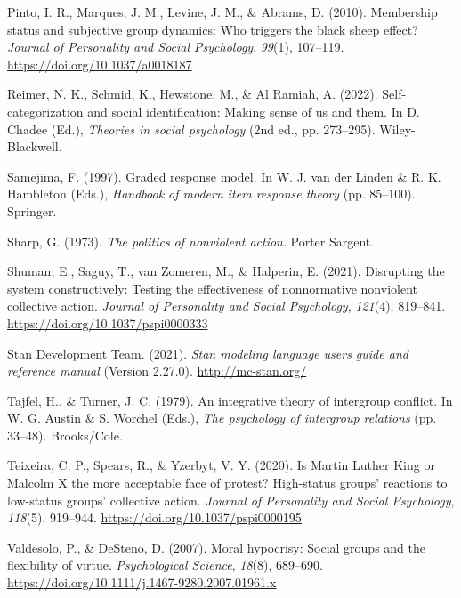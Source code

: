 \documentclass[twocolumn, 11pt, letterpaper]{article}
\newenvironment{CSLReferences}[2]{}{}
\begin{document}
\begin{CSLReferences}{1}{0}
\leavevmode{}%
Pinto, I. R., Marques, J. M., Levine, J. M., \& Abrams, D. (2010).
Membership status and subjective group dynamics: Who triggers the black
sheep effect? \emph{Journal of Personality and Social Psychology},
\emph{99}(1), 107--119. \url{https://doi.org/10.1037/a0018187}

\leavevmode{}%
Reimer, N. K., Schmid, K., Hewstone, M., \& Al Ramiah, A. (2022).
Self-categorization and social identification: Making sense of us and
them. In D. Chadee (Ed.), \emph{Theories in social psychology} (2nd ed.,
pp. 273--295). Wiley-Blackwell.

\leavevmode{}%
Samejima, F. (1997). Graded response model. In W. J. van der Linden \&
R. K. Hambleton (Eds.), \emph{Handbook of modern item response theory}
(pp. 85--100). Springer.

\leavevmode{}%
Sharp, G. (1973). \emph{The politics of nonviolent action}. Porter
Sargent.

\leavevmode{}%
Shuman, E., Saguy, T., van Zomeren, M., \& Halperin, E. (2021).
Disrupting the system constructively: {Testing} the effectiveness of
nonnormative nonviolent collective action. \emph{Journal of Personality
and Social Psychology}, \emph{121}(4), 819--841.
\url{https://doi.org/10.1037/pspi0000333}

\leavevmode{}%
Stan Development Team. (2021). \emph{Stan modeling language users guide
and reference manual} (Version 2.27.0). \url{http://mc-stan.org/}

\leavevmode{}%
Tajfel, H., \& Turner, J. C. (1979). An integrative theory of intergroup
conflict. In W. G. Austin \& S. Worchel (Eds.), \emph{The psychology of
intergroup relations} (pp. 33--48). Brooks/Cole.

\leavevmode{}%
Teixeira, C. P., Spears, R., \& Yzerbyt, V. Y. (2020). Is {Martin}
{Luther} {King} or {Malcolm} {X} the more acceptable face of protest?
{High}-status groups' reactions to low-status groups' collective action.
\emph{Journal of Personality and Social Psychology}, \emph{118}(5),
919--944. \url{https://doi.org/10.1037/pspi0000195}

\leavevmode{}%
Valdesolo, P., \& DeSteno, D. (2007). Moral hypocrisy: Social groups and
the flexibility of virtue. \emph{Psychological Science}, \emph{18}(8),
689--690. \url{https://doi.org/10.1111/j.1467-9280.2007.01961.x}


\end{CSLReferences}
\end{document}

